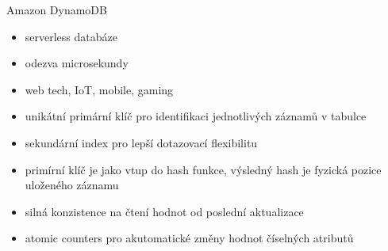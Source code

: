 \documentclass{article}
\begin{document}
 	 	 
	\begin{subsubsection}{Amazon DynamoDB}
		\begin{itemize}
			\item serverless databáze
			\item odezva microsekundy
			\item web tech, IoT, mobile, gaming
			\item unikátní primární klíč pro identifikaci jednotlivých záznamů v tabulce
			\item sekundární index pro lepší dotazovací flexibilitu
			\item primírní klíč je jako vtup do hash funkce, výsledný hash je fyzická pozice uloženého záznamu
			\item silná konzistence na čtení hodnot od poslední aktualizace
			\item atomic counters pro akutomatické změny hodnot číselných atributů
		\end{itemize}
	\end{subsubsection}
\end{document}
